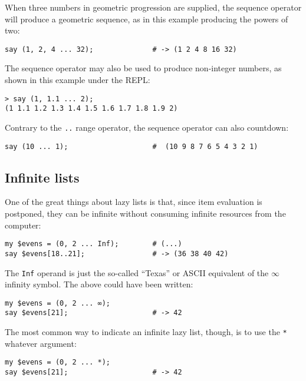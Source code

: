 When three numbers in geometric progression are supplied, the 
sequence operator will produce a geometric sequence, as in 
this example producing the powers of two:

\begin{verbatim}
say (1, 2, 4 ... 32);              # -> (1 2 4 8 16 32)
\end{verbatim}

The sequence operator may also be used to produce non-integer 
numbers, as shown in this example under the REPL:

\begin{verbatim}
> say (1, 1.1 ... 2);
(1 1.1 1.2 1.3 1.4 1.5 1.6 1.7 1.8 1.9 2)
\end{verbatim}

Contrary to the \verb'..' range operator, the sequence 
operator can also countdown:

\begin{verbatim}
say (10 ... 1);                    #  (10 9 8 7 6 5 4 3 2 1)
\end{verbatim}

\subsection{Infinite lists}

One of the great things about lazy lists is that, since 
item evaluation is postponed, they can be infinite without 
consuming infinite resources from the computer:

\begin{verbatim}
my $evens = (0, 2 ... Inf);        # (...)
say $evens[18..21];                # -> (36 38 40 42)
\end{verbatim}

The {\tt Inf} operand is just the so-called ``Texas'' 
or ASCII equivalent of the $\infty$ infinity symbol. 
The above could have been written:

\begin{verbatim}
my $evens = (0, 2 ... ∞); 
say $evens[21];                    # -> 42
\end{verbatim} 

The most common way to indicate an infinite lazy list, though, 
is to use the \verb'*' whatever argument:

\begin{verbatim}
my $evens = (0, 2 ... *); 
say $evens[21];                    # -> 42
\end{verbatim} 

